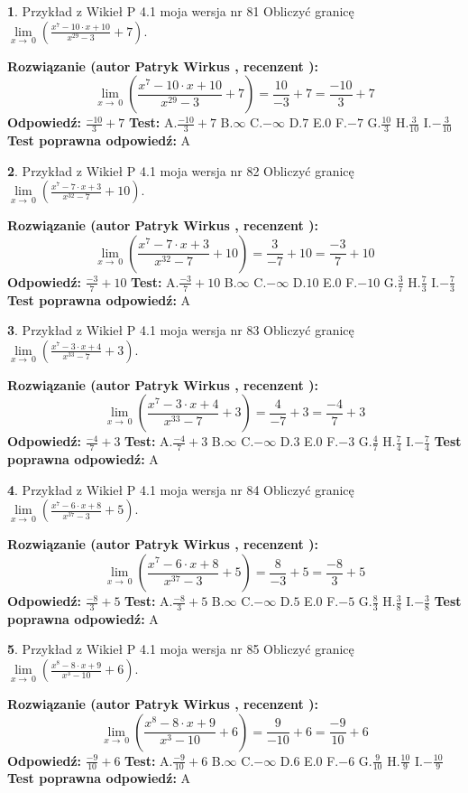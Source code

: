 \documentclass[12pt, a4paper]{article}
\theoremstyle{definition} %
\newtheorem{zad}{}
\newcommand{\zadStart}[1]{\begin{zad}#1\newline}
\newcommand{\zadStop}{\end{zad}}
\newcommand{\rozwStart}[2]{\noindent \textbf{Rozwiązanie (autor #1 , recenzent #2): }\newline}
\newcommand{\rozwStop}{\newline}
\newcommand{\odpStart}{\noindent \textbf{Odpowiedź:}\newline}
\newcommand{\odpStop}{\newline}
\newcommand{\testStart}{\noindent \textbf{Test:}\newline}
\newcommand{\testStop}{\newline}
\newcommand{\kluczStart}{\noindent \textbf{Test poprawna odpowiedź:}\newline}
\newcommand{\kluczStop}{\newline}
\begin{document}
\zadStart{Przykład z Wikieł P 4.1 moja wersja nr 81}
Obliczyć granicę $\lim\limits_{x\to\ 0}(\frac{x^{7}-10 \cdot x +10}{x^{29}-3}+7)$.
\zadStop
\rozwStart{Patryk Wirkus}{}
$$\lim\limits_{x\to\ 0}(\frac{x^{7}-10 \cdot x +10}{x^{29}-3}+7)=\frac{10}{-3}+7=\frac{-10}{3}+7$$
\rozwStop
\odpStart
$\frac{-10}{3}+7$
\odpStop
\testStart
A.$\frac{-10}{3}+7$
B.$\infty$
C.$-\infty$
D.$7$
E.$0$
F.$-7$
G.$\frac{10}{3}$
H.$\frac{3}{10}$
I.$-\frac{3}{10}$
\testStop
\kluczStart
A
\kluczStop



\zadStart{Przykład z Wikieł P 4.1 moja wersja nr 82}
Obliczyć granicę $\lim\limits_{x\to\ 0}(\frac{x^{7}-7 \cdot x +3}{x^{32}-7}+10)$.
\zadStop
\rozwStart{Patryk Wirkus}{}
$$\lim\limits_{x\to\ 0}(\frac{x^{7}-7 \cdot x +3}{x^{32}-7}+10)=\frac{3}{-7}+10=\frac{-3}{7}+10$$
\rozwStop
\odpStart
$\frac{-3}{7}+10$
\odpStop
\testStart
A.$\frac{-3}{7}+10$
B.$\infty$
C.$-\infty$
D.$10$
E.$0$
F.$-10$
G.$\frac{3}{7}$
H.$\frac{7}{3}$
I.$-\frac{7}{3}$
\testStop
\kluczStart
A
\kluczStop



\zadStart{Przykład z Wikieł P 4.1 moja wersja nr 83}
Obliczyć granicę $\lim\limits_{x\to\ 0}(\frac{x^{7}-3 \cdot x +4}{x^{33}-7}+3)$.
\zadStop
\rozwStart{Patryk Wirkus}{}
$$\lim\limits_{x\to\ 0}(\frac{x^{7}-3 \cdot x +4}{x^{33}-7}+3)=\frac{4}{-7}+3=\frac{-4}{7}+3$$
\rozwStop
\odpStart
$\frac{-4}{7}+3$
\odpStop
\testStart
A.$\frac{-4}{7}+3$
B.$\infty$
C.$-\infty$
D.$3$
E.$0$
F.$-3$
G.$\frac{4}{7}$
H.$\frac{7}{4}$
I.$-\frac{7}{4}$
\testStop
\kluczStart
A
\kluczStop



\zadStart{Przykład z Wikieł P 4.1 moja wersja nr 84}
Obliczyć granicę $\lim\limits_{x\to\ 0}(\frac{x^{7}-6 \cdot x +8}{x^{37}-3}+5)$.
\zadStop
\rozwStart{Patryk Wirkus}{}
$$\lim\limits_{x\to\ 0}(\frac{x^{7}-6 \cdot x +8}{x^{37}-3}+5)=\frac{8}{-3}+5=\frac{-8}{3}+5$$
\rozwStop
\odpStart
$\frac{-8}{3}+5$
\odpStop
\testStart
A.$\frac{-8}{3}+5$
B.$\infty$
C.$-\infty$
D.$5$
E.$0$
F.$-5$
G.$\frac{8}{3}$
H.$\frac{3}{8}$
I.$-\frac{3}{8}$
\testStop
\kluczStart
A
\kluczStop



\zadStart{Przykład z Wikieł P 4.1 moja wersja nr 85}
Obliczyć granicę $\lim\limits_{x\to\ 0}(\frac{x^{8}-8 \cdot x +9}{x^{3}-10}+6)$.
\zadStop
\rozwStart{Patryk Wirkus}{}
$$\lim\limits_{x\to\ 0}(\frac{x^{8}-8 \cdot x +9}{x^{3}-10}+6)=\frac{9}{-10}+6=\frac{-9}{10}+6$$
\rozwStop
\odpStart
$\frac{-9}{10}+6$
\odpStop
\testStart
A.$\frac{-9}{10}+6$
B.$\infty$
C.$-\infty$
D.$6$
E.$0$
F.$-6$
G.$\frac{9}{10}$
H.$\frac{10}{9}$
I.$-\frac{10}{9}$
\testStop
\kluczStart
A
\kluczStop
\end{document}
